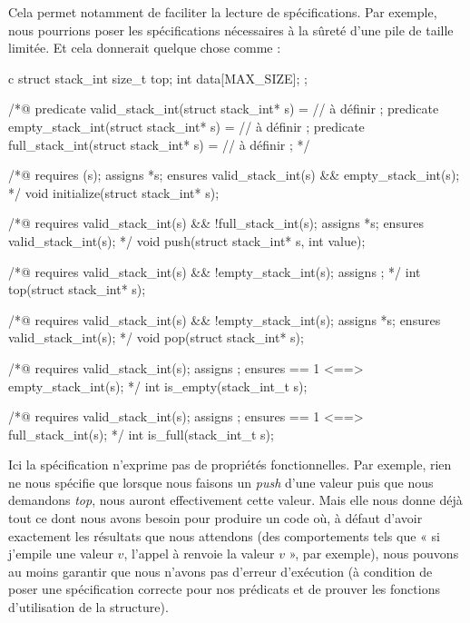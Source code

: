 \documentclass[middle]{zmdocument}
\begin{document}
Cela permet notamment de faciliter la lecture de spécifications. Par exemple, nous
pourrions poser les spécifications nécessaires à la sûreté d'une pile de taille 
limitée. Et cela donnerait quelque chose comme :



\begin{CodeBlock}{c}
struct stack_int{
  size_t top;
  int    data[MAX_SIZE];
};

/*@
  predicate valid_stack_int(struct stack_int* s) = // à définir ;
  predicate empty_stack_int(struct stack_int* s) = // à définir ;
  predicate full_stack_int(struct stack_int* s) =  // à définir ;
*/

/*@
  requires \valid(s);
  assigns *s;
  ensures valid_stack_int(s) && empty_stack_int(s);
*/
void initialize(struct stack_int* s);

/*@
  requires valid_stack_int(s) && !full_stack_int(s);
  assigns  *s;
  ensures valid_stack_int(s);
*/
void push(struct stack_int* s, int value);

/*@
  requires valid_stack_int(s) && !empty_stack_int(s);
  assigns \nothing;
*/
int  top(struct stack_int* s);

/*@
  requires valid_stack_int(s) && !empty_stack_int(s);
  assigns *s;
  ensures valid_stack_int(s);
*/
void pop(struct stack_int* s);

/*@
  requires valid_stack_int(s);
  assigns \nothing;
  ensures \result == 1 <==> empty_stack_int(s);
*/
int  is_empty(stack_int_t s);


/*@
  requires valid_stack_int(s);
  assigns \nothing;
  ensures \result == 1 <==> full_stack_int(s);
*/
int  is_full(stack_int_t s);
\end{CodeBlock}



Ici la spécification n'exprime pas de propriétés fonctionnelles. Par exemple, 
rien ne nous spécifie que lorsque nous faisons un \textit{push} d'une valeur puis que nous
demandons \textit{top}, nous auront effectivement cette valeur. Mais elle nous donne 
déjà tout ce dont nous avons besoin pour produire un code où, à défaut d'avoir 
exactement les résultats que nous attendons (des comportements tels que « si 
j'empile une valeur $v$, l'appel à  renvoie la valeur $v$ », par exemple), nous
 pouvons au moins garantir que nous n'avons pas d'erreur d'exécution (à condition 
de poser une spécification correcte pour nos prédicats et de prouver les fonctions 
d'utilisation de la structure).
\end{document}

